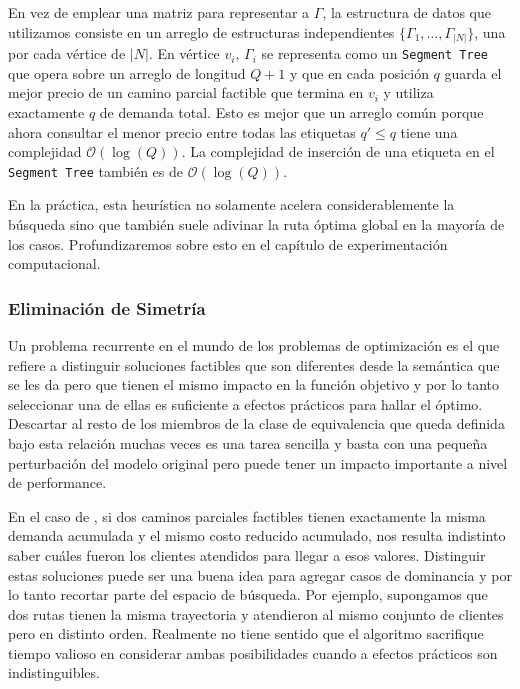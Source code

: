 En vez de emplear una matriz para representar a $\Gamma$, la estructura de datos que utilizamos consiste en un arreglo de estructuras independientes $\{\Gamma_1, \dots, \Gamma_{|N|}\}$, una por cada vértice de $|N|$. En vértice $v_i$, $\Gamma_i$ se representa como un \texttt{Segment Tree} que opera sobre un arreglo de longitud $Q + 1$ y que en cada posición $q$ guarda el mejor precio de un camino parcial factible que termina en $v_i$ y utiliza exactamente $q$ de demanda total. Esto es mejor que un arreglo común porque ahora consultar el menor precio entre todas las etiquetas $q' \leq q$ tiene una complejidad $\mathcal{O}(\log(Q))$. La complejidad de inserción de una etiqueta en el \texttt{Segment Tree} también es de $\mathcal{O}(\log(Q))$.

En la práctica, esta heurística no solamente acelera considerablemente la bús\-queda sino que también suele adivinar la ruta óptima global en la mayoría de los casos. Profundizaremos sobre esto en el capítulo de experimentación computacional.


\subsubsection{Eliminación de Simetría}

Un problema recurrente en el mundo de los problemas de optimización es el que refiere a distinguir soluciones factibles que son diferentes desde la semántica que se les da pero que tienen el mismo impacto en la función objetivo y por lo tanto seleccionar una de ellas es suficiente a efectos prácticos para hallar el óptimo. Descartar al resto de los miembros de la clase de equivalencia que queda definida bajo esta relación muchas veces es una tarea sencilla y basta con una pequeña perturbación del modelo original pero puede tener un impacto importante a nivel de performance. 

En el caso de , si dos caminos parciales factibles tienen exactamente la misma demanda acumulada y el mismo costo reducido acumulado, nos resulta indistinto saber cuáles fueron los clientes atendidos para llegar a esos valores. Distinguir estas soluciones puede ser una buena idea para agregar casos de dominancia y por lo tanto recortar parte del espacio de búsqueda. Por ejemplo, supongamos que dos rutas tienen la misma trayectoria y atendieron al mismo conjunto de clientes pero en distinto orden. Realmente no tiene sentido que el algoritmo sacrifique tiempo valioso en considerar ambas posibilidades cuando a efectos prácticos son indistinguibles. 

